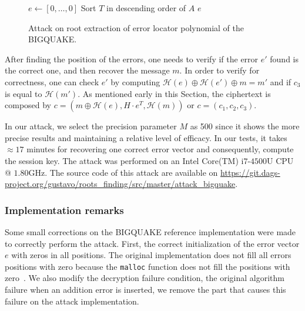 \begin{figure}[ht]
\centering
\begin{algorithm}[H]
 $e \gets [0,\ldots,0]$\;
Sort $T$ in descending order of $A$\;
\Return $e$\;
 \caption{Attack on root extraction of error locator polynomial of the BIGQUAKE.}
  \label{alg:attack:1}
\end{algorithm}
\end{figure}

After finding the position of the errors, one needs to verify if the error $e'$ found is the correct one, and then recover the message $m$. In order to verify for correctness, one can check $e'$ by computing $\mathcal{H}(e) \oplus \mathcal{H}(e') \oplus m = m'$ and if $c_3$ is equal to $\mathcal{H}(m')$. As mentioned early in this Section, the ciphertext is composed by $c = (m\oplus\mathcal{H}(e), H\cdot e^T, \mathcal{H}(m))$ or $c = (c_1, c_2, c_3)$.

In our attack, we select the precision parameter $M$ as 500 since it shows the more precise results and maintaining a relative level of efficacy.  In our tests, it takes $\approx17$ minutes for recovering one correct error vector and consequently, compute the session key. The attack was performed on an Intel\textsuperscript{\tiny\textregistered} Core(TM) i$7$-$4500$U CPU @ $1.80$GHz. The source code of this attack are available on \url{https://git.dags-project.org/gustavo/roots_finding/src/master/attack_bigquake}.

\subsubsection{Implementation remarks}
Some small corrections on the BIGQUAKE reference implementation were made to correctly perform the attack. First, the correct initialization of the error vector $e$ with zeros in all positions. The original implementation does not fill all errors positions with zero because the \texttt{malloc} function does not fill the positions with zero~\cite{c++2014iso}. We also modify the decryption failure condition, the original algorithm failure when an addition error is inserted, we remove the part that causes this failure on the attack implementation.

